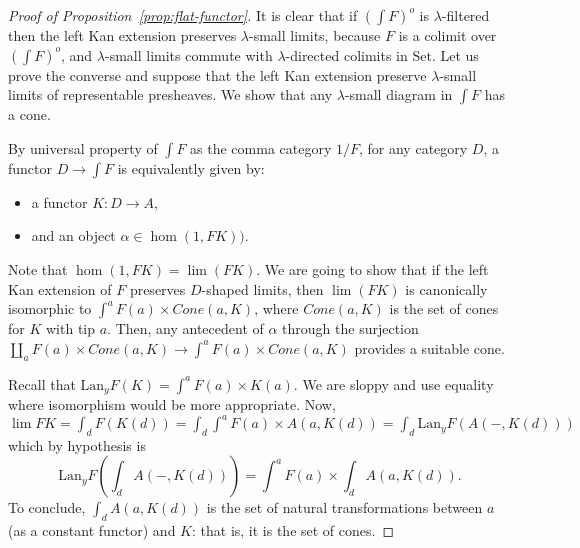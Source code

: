 \documentclass{article}
\newcommand{\Lan}{\text{Lan}}
\newcommand{\Set}{\text{Set}}
\begin{document}
\begin{proof}[Proof of Proposition~\ref{prop:flat-functor}]
It is clear that if $(\int F)^o$ is $\lambda$-filtered then the left Kan extension preserves
$\lambda$-small limits, because $F$ is a colimit over $(\int F)^o$, and
$\lambda$-small limits commute with $\lambda$-directed colimits in $\Set$.
Let us prove the converse and suppose that the left Kan extension preserve
$\lambda$-small limits of representable presheaves.
We show that any $\lambda$-small diagram in $\int F$ has a cone.
  
 By universal property of $\int F$ as the comma category $1/F$, for any category
 $D$, a functor $D \rightarrow \int F$ is equivalently given by:
 \begin{itemize}
 \item a functor $K : D  \rightarrow A$,
   \item and an object $\alpha\in \hom(1,FK))$.
 \end{itemize}
 Note that $\hom(1,FK) = \lim (FK)$. We are going to show that if the left
 Kan extension of $F$ preserves $D$-shaped limits, then $\lim(FK)$
 is canonically isomorphic to
 $\int^a F(a)\times Cone (a, K)$, where $Cone(a, K)$ is the set of cones for $K$
 with tip $a$.
Then, any antecedent of $\alpha$ through the surjection 
$\amalg_a F(a)\times Cone (a, K) \rightarrow \int^a F(a)\times Cone (a, K)$
provides a suitable cone.

Recall that $\Lan_yF(K) = \int^a F(a)\times K(a)$.
We are sloppy and use equality where isomorphism would be more appropriate.
Now, $\lim F K = \int_d F(K(d)) = \int_d\int^a F(a)\times  A(a, K(d)) =
\int_d \Lan_yF( A(-, K(d)))$ which by hypothesis is
$$ \Lan_yF(\int_dA(-,K(d)))=\int^a F(a)\times \int_dA(a, K(d)).$$
To conclude,
$\int_dA(a,K(d))$ is the set of natural transformations between
$a$ (as a constant functor) and $K$: that is, it is the set of cones.



\end{proof}
\end{document}
